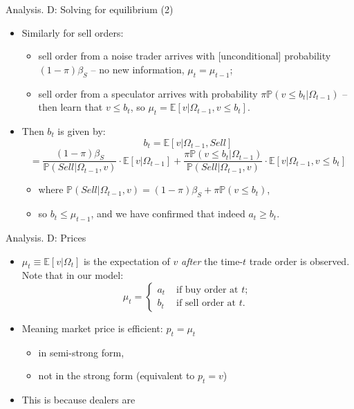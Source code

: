 \documentclass[english,10pt]{beamer}
\begin{document}
\begin{frame}{Analysis. D: Solving for equilibrium (2)}
	\begin{itemize}
		\item Similarly for \alert{sell orders}:
		\begin{itemize}
			\item sell order from a noise trader arrives with [unconditional] probability $(1-\pi)\beta_S$ -- no new information, $\mu_t = \mu_{t-1}$;
			\item sell order from a speculator arrives with probability $\pi \mathbb{P}(v \leq b_t | \Omega_{t-1})$ -- then learn that $v \leq b_t$, so $\mu_t = \mathbb{E} [v | \Omega_{t-1}, v \leq b_t]$.
		\end{itemize}
		\item Then $b_t$ is given by:
		$$ b_t = \mathbb{E}[v|\Omega_{t-1}, Sell] $$
		$$ = \frac{(1-\pi)\beta_S}{\mathbb{P}(Sell|\Omega_{t-1}, v)} \cdot \mathbb{E}[v|\Omega_{t-1}] + \frac{\pi \mathbb{P}(v \leq b_t | \Omega_{t-1})}{\mathbb{P}(Sell|\Omega_{t-1}, v)} \cdot \mathbb{E} [v | \Omega_{t-1}, v \leq b_t] $$
		\begin{itemize}
			\item where $\mathbb{P}(Sell|\Omega_{t-1}, v) = (1-\pi) \beta_S + \pi \mathbb{P}(v\leq b_t)$,
			\item so $b_t \leq \mu_{t-1}$, and we have confirmed that indeed $a_t \geq b_t$.
		\end{itemize}
	\end{itemize}
\end{frame}


\begin{frame}{Analysis. D: Prices}
	\begin{itemize}
		\item $\mu_t \equiv \mathbb{E}[v | \Omega_t]$ is the expectation of $v$ \textit{after} the time-$t$ trade order is observed. Note that in our model:
		$$\mu_t = \begin{cases}
			a_t & \text{ if buy order at } t;
			\\
			b_t & \text{ if sell order at } t.
		\end{cases} $$
		\item Meaning market price is efficient: $p_t = \mu_t$
		\begin{itemize}
			\item in \alert{semi-strong} form,
			\item not in the \alert{strong} form (equivalent to $p_t = v$)
		\end{itemize}
		\item This is because dealers are 
	\end{itemize}
\end{frame}
\end{document}

